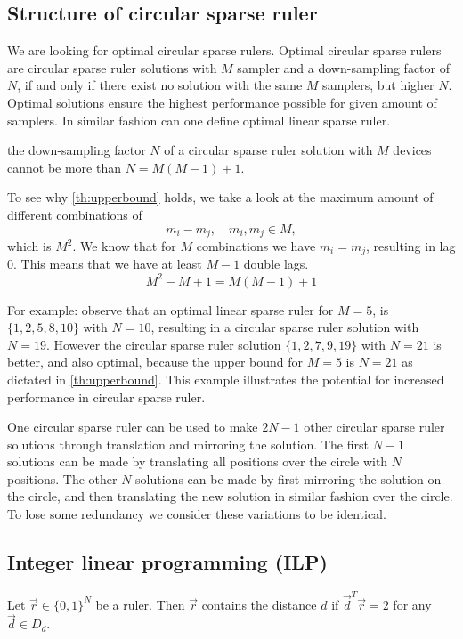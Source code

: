 \documentclass[a4paper, openany, oneside]{memoir}
\begin{document}
\subsection{Structure of circular sparse ruler}
We are looking for optimal circular sparse rulers. Optimal circular sparse rulers are circular sparse ruler solutions with $M$ sampler and a down-sampling factor of $N$, if and only if there exist no solution with the same $M$ samplers, but higher $N$. Optimal solutions ensure the highest performance possible for given amount of samplers. In similar fashion can one define optimal linear sparse ruler. 

\begin{blockTheorem}\label{th:upperbound}
the down-sampling factor $N$ of a circular sparse ruler solution with $M$ devices cannot be more than $N=M(M-1)+1$. 
\end{blockTheorem}

To see why \cref{th:upperbound} holds, we take a look at the maximum amount of different combinations of $$m_i-m_j, \quad m_i, m_j \in M,$$ which is $M^2$. We know that for $M$ combinations we have $m_i=m_j$, resulting in lag 0. This means that we have at least $M-1$ double lags. $$M^2-M+1 = M(M-1)+1$$

For example: observe that an optimal linear sparse ruler for $M=5$, is $\{1,2,5,8,10\}$ with $N=10$, resulting in a circular sparse ruler solution with $N=19$. However the circular sparse ruler solution $\{1,2,7,9,19\}$ with $N=21$ is better, and also optimal, because the upper bound for $M=5$ is $N=21$ as dictated in \cref{th:upperbound}. This example illustrates the potential for increased performance in circular sparse ruler. 

One circular sparse ruler can be used to make $2N-1$ other circular sparse ruler solutions through translation and mirroring the solution. The first $N-1$ solutions can be made by translating all positions over the circle with $N$ positions. The other $N$ solutions can be made by first mirroring the solution on the circle, and then translating the new solution in similar fashion over the circle. To lose some redundancy we consider these variations to be identical.    

\subsection{Integer linear programming (ILP)}
\begin{blockTheorem} \label{th:ruler-distance}\nolinebreak
    Let $\vec{r} \in \{0,1\}^N$ be a ruler. Then $\vec{r}$ contains the distance $d$ if $\vec{d}^T \vec{r} = 2$ for any $\vec{d} \in D_d$.\nolinebreak
\end{blockTheorem}
\end{document}
